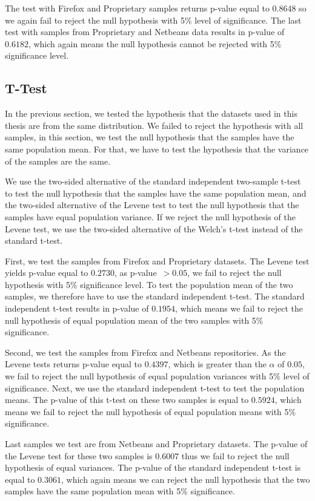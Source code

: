 The test with Firefox and Proprietary samples returns p-value equal to $0.8648$ so we again fail to reject the null hypothesis with 5\% level of significance. The last test with samples from Proprietary and Netbeans data results in p-value of $0.6182$, which again means the null hypothesis cannot be rejected with 5\% significance level.

\subsection{T-Test}

In the previous section, we tested the hypothesis that the datasets used in this thesis are from the same distribution. We failed to reject the hypothesis with all samples, in this section, we test the null hypothesis that the samples have the same population mean. For that, we have to test the hypothesis that the variance of the samples are the same.

We use the two-sided alternative of the standard independent two-sample t-test to test the null hypothesis that the samples have the same population mean, and the two-sided alternative of the Levene test to test the null hypothesis that the samples have equal population variance. If we reject the null hypothesis of the Levene test, we use the two-sided alternative of the Welch's t-test instead of the standard t-test.

First, we test the samples from Firefox and Proprietary datasets. The Levene test yields p-value equal to $0.2730$, as p-value~$> 0.05$, we fail to reject the null hypothesis with 5\% significance level. To test the population mean of the two samples, we therefore have to use the standard independent t-test. The standard independent t-test results in p-value of $0.1954$, which means we fail to reject the null hypothesis of equal population mean of the two samples with 5\% significance.

Second, we test the samples from Firefox and Netbeans repositories. As the Levene tests returns p-value equal to $0.4397$, which is greater than the $\alpha$ of $0.05$, we fail to reject the null hypothesis of equal population variances with 5\% level of significance. Next, we use the standard independent t-test to test the population means. The p-value of this t-test on these two samples is equal to $0.5924$, which means we fail to reject the null hypothesis of equal population means with 5\% significance.

Last samples we test are from Netbeans and Proprietary datasets. The p-value of the Levene test for these two samples is $0.6007$ thus we fail to reject the null hypothesis of equal variances. The p-value of the standard independent t-test is equal to $0.3061$, which again means we can reject the null hypothesis that the two samples have the same population mean with 5\% significance.

